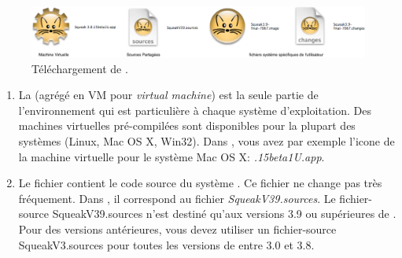 \documentclass[a4paper,10pt,twoside]{book}
\begin{document}
\begin{figure}[htb]
\centerline {\includegraphics[width=\textwidth]{annotatedDownload}}
\caption{Téléchargement de \sq. \label{fig:download}}
\end{figure}

\begin{enumerate}


\item La  (agr\'eg\'e en VM pour
  \emph{virtual machine}) est la seule partie de l'environnement qui
  est particulière à chaque système d'exploitation. Des machines
  virtuelles pré-compilées sont disponibles pour la plupart des
  systèmes (Linux, Mac OS X, Win32). Dans , vous
  avez par exemple l'icone de la machine virtuelle pour le syst\`eme Mac OS X: \textit{.15beta1U.app}.


  \item Le fichier  contient le code source du système
    \sq. Ce fichier ne change pas tr\`es fréquement. Dans , il
    correspond au fichier \emph{SqueakV39.sources}. Le fichier-source SqueakV39.sources n'est destiné qu'aux versions 3.9 ou supérieures de \sq. Pour des versions antérieures, vous devez utiliser un fichier-source SqueakV3.sources pour toutes les versions de \sq entre 3.0 et 3.8.


\end{enumerate}
\end{document}
